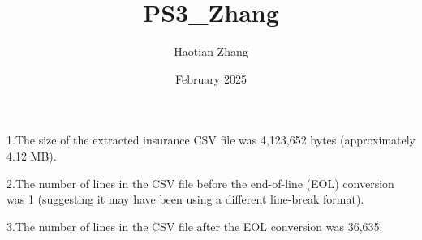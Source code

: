 \documentclass{article}
\title{PS3_Zhang}
\author{Haotian Zhang}
\date{February 2025}
\begin{document}
\maketitle

1.The size of the extracted insurance CSV file was 4,123,652 bytes (approximately 4.12 MB).

2.The number of lines in the CSV file before the end-of-line (EOL) conversion was 1 (suggesting it may have been using a different line-break format).

3.The number of lines in the CSV file after the EOL conversion was 36,635. ​
\end{document}
